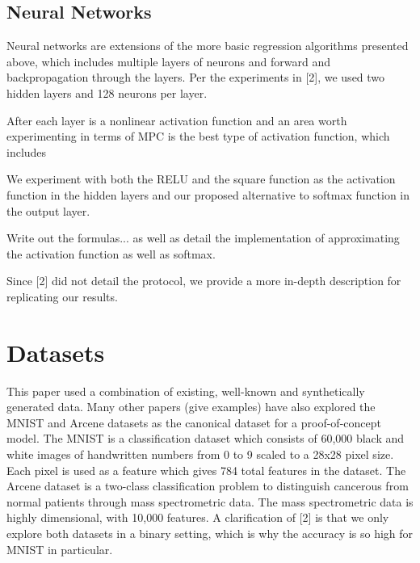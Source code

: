 \documentclass{article}
\makeatletter
\theoremstyle{plain}
\theoremstyle{definition}
\theoremstyle{remark}
\def\BState{\State\hskip-\ALG@thistlm}
\makeatother
\begin{document}
\subsection{Neural Networks}

Neural networks are extensions of the more basic regression algorithms presented above, which includes multiple layers of neurons and forward and backpropagation through the layers. Per the experiments in [2], we used two hidden layers and 128 neurons per layer.

After each layer is a nonlinear activation function and an area worth experimenting in terms of MPC is the best type of activation function, which includes 

We experiment with both the RELU and the square function as the activation function in the hidden layers and our proposed alternative to softmax function in the output layer. 

Write out the formulas... as well as detail the implementation of approximating the activation function as well as softmax. 

Since [2] did not detail the protocol, we provide a more in-depth description for replicating our results. 

\begin{algorithm}[H]
\caption{}\label{euclid}
\end{algorithm}

\section{Datasets}

This paper used a combination of existing, well-known and synthetically generated data. Many other papers (give examples) have also explored the MNIST and Arcene datasets as the canonical dataset for a proof-of-concept model. The MNIST is a classification dataset which consists of 60,000 black and white images of handwritten numbers from 0 to 9 scaled to a 28x28 pixel size. Each pixel is used as a feature which gives 784 total features in the dataset. The Arcene dataset is a two-class classification problem to distinguish cancerous from normal patients through mass spectrometric data. The mass spectrometric data is highly dimensional, with 10,000 features. A clarification of [2] is that we only explore both datasets in a binary setting, which is why the accuracy is so high for MNIST in particular.\\
\end{document}
